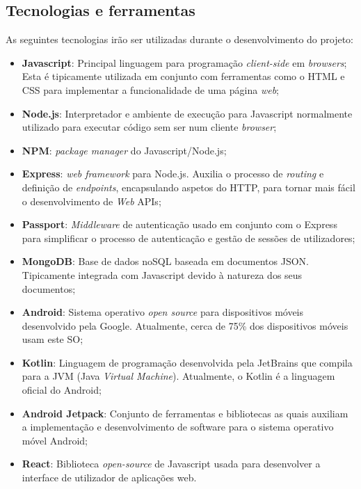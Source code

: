 \subsection{Tecnologias e ferramentas}
As seguintes tecnologias irão ser utilizadas durante o desenvolvimento do projeto:
\begin{itemize}
	\item \textbf{Javascript}: Principal linguagem para programação \textit{client-side} em \textit{browsers}; Esta é tipicamente utilizada em conjunto com ferramentas como o HTML e CSS para implementar a funcionalidade de uma página \textit{web};
	\item \textbf{Node.js}: Interpretador e ambiente de execução para Javascript normalmente utilizado para executar código sem ser num cliente \textit{browser};
	\item \textbf{NPM}: \textit{package manager} do Javascript/Node.js;
	\item \textbf{Express}: \textit{web framework} para Node.js. Auxilia o processo de \textit{routing} e definição de \textit{endpoints}, encapsulando aspetos do HTTP, para tornar mais fácil o desenvolvimento de \textit{Web} APIs;
	\item \textbf{Passport}: \textit{Middleware} de autenticação usado em conjunto com o Express para simplificar o processo de autenticação e gestão de sessões de utilizadores;
	\item \textbf{MongoDB}: Base de dados noSQL baseada em documentos JSON. Tipicamente integrada com Javascript devido à natureza dos seus documentos;
	\item \textbf{Android}: Sistema operativo \textit{open source} para dispositivos móveis desenvolvido pela Google. Atualmente, cerca de 75\% dos dispositivos móveis usam este SO;
	\item \textbf{Kotlin}: Linguagem de programação desenvolvida pela JetBrains que compila para a JVM (Java \textit{Virtual Machine}). Atualmente, o Kotlin é a linguagem oficial do Android;
	\item \textbf{Android Jetpack}: Conjunto de ferramentas e bibliotecas as quais auxiliam a implementação e desenvolvimento de software para o sistema operativo móvel Android;
	\item \textbf{React}: Biblioteca \textit{open-source} de Javascript usada para desenvolver a interface de utilizador de aplicações web.
\end{itemize}